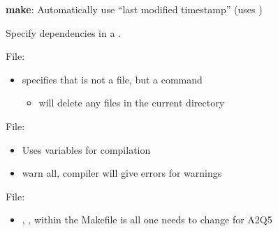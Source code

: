 \textbf{make}: Automatically use ``last modified timestamp'' (uses )

Specify dependencies in a .


File: 
\begin{itemize}
      \item {} \textrightarrow{} specifies that  is not a file, but
            a command
            \begin{itemize}
                  \item {} \textrightarrow{}  will delete any  files
                        in the current directory
            \end{itemize}
\end{itemize}

File: 
\begin{itemize}
      \item Uses variables for compilation
      \item {} \textrightarrow{} warn all, compiler will give errors for warnings
\end{itemize}

File: 
\begin{itemize}
      \item {}, ,  within
            the Makefile is all one needs to change for A2Q5
\end{itemize}
